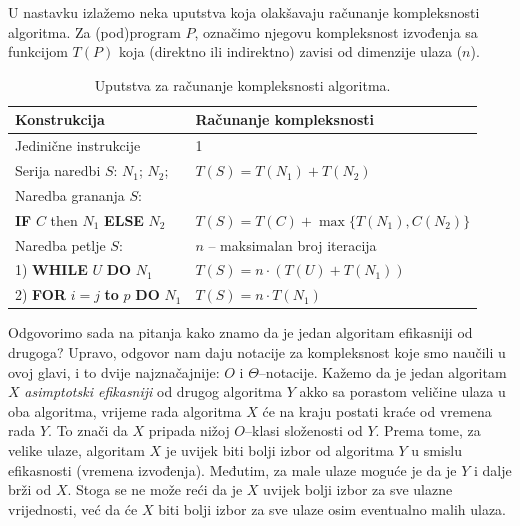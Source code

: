 U nastavku izlažemo neka uputstva koja olakšavaju računanje kompleksnosti algoritma. Za (pod)program $P$, označimo njegovu kompleksnost izvođenja sa funkcijom $T(P)$ koja (direktno ili indirektno) zavisi od dimenzije ulaza ($n$). 
 
\begin{table}[H]
	\centering
	\begin{tabular}{l |l}
		\textbf{Konstrukcija}         & \textbf{Računanje kompleksnosti} \\ \hline
		Jedinične instrukcije         & 1 \\
        Serija naredbi $S$: $N_1$; $N_2$; &  $T(S) = T(N_1) + T(N_2)$  \\ \hline
        Naredba grananja $S$:           &                                \\
        \textbf{IF}  $C$ then $N_1$ \textbf{ELSE} $N_2$  & $T(S) = T(C) + \max\{ T(N_1), C(N_2)\}$  \\          \hline                 
         Naredba petlje $S$:            &   $n$ -- maksimalan broj iteracija          \\
         1) \textbf{WHILE} $U$ \textbf{DO} $N_1$                 &     $T(S)= n \cdot (T(U) + T(N_1))$         \\ 
         2) \textbf{FOR} $i=j$ \textbf{to} $p$ \textbf{DO} $N_1$  &    $T(S)= n\cdot T(N_1)$     \\  \hline
         
	\end{tabular}
	
	\caption{Uputstva za računanje kompleksnosti algoritma.}  \label{tab:uputstva_racunanje}
\end{table}

Odgovorimo sada na pitanja kako znamo da je jedan algoritam efikasniji od drugoga?
Upravo, odgovor nam daju notacije za kompleksnost koje smo naučili u ovoj glavi, i to dvije najznačajnije: $O$ i $\Theta$--notacije. Kažemo da je jedan algoritam $X$ \textit{asimptotski efikasniji} od drugog algoritma  $Y$ akko sa porastom veličine ulaza u oba algoritma, vrijeme rada algoritma $X$ će na kraju postati kraće od vremena rada $Y$. To znači da $X$ pripada nižoj $O$--klasi složenosti od $Y$. %
Prema tome, za velike ulaze, algoritam $X$ je uvijek biti bolji izbor od  algoritma $Y$ u smislu efikasnosti (vremena izvođenja). Međutim, za male ulaze moguće je da je $Y$ i dalje brži od $X$. Stoga se ne može reći da je $X$ uvijek bolji izbor za sve ulazne vrijednosti, već da će $X$ biti bolji izbor za sve ulaze osim eventualno malih ulaza.


